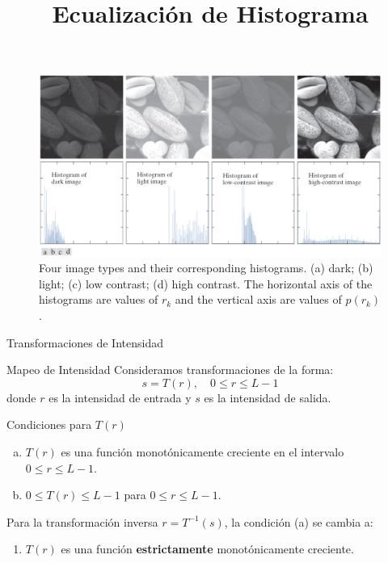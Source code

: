 \documentclass{beamer}
\begin{document}
\begin{frame}
    \begin{figure}
    \centering
      \includegraphics[width=0.8\linewidth]{figuras/Fig_3_16.png}
    \caption{Four image types and their corresponding histograms. (a) dark; (b) light; (c) low contrast; (d) high contrast. The horizontal axis of the histograms are values of $r_{k}$ and the vertical axis are values of $p(r_{k})$.}
    \end{figure}
\end{frame}

\title[Ecualización de Histograma]{Ecualización de Histograma}
\subtitle{}
\author[Tu Nombre/Institución]{}
\date{}
\institute{}
\begin{frame}
  \titlepage
\end{frame}


\begin{frame}{Transformaciones de Intensidad}
  \begin{block}{Mapeo de Intensidad}
    Consideramos transformaciones de la forma:
    \begin{equation}
      s = T(r), \quad 0 \le r \le L-1
    \end{equation}
    donde $r$ es la intensidad de entrada y $s$ es la intensidad de salida.
  \end{block}
  \pause
  \begin{alertblock}{Condiciones para $T(r)$}
    \begin{enumerate}[(a)]
      \item $T(r)$ es una función monotónicamente creciente en el intervalo $0 \le r \le L-1$.
      \item $0 \le T(r) \le L-1$ para $0 \le r \le L-1$.
    \end{enumerate}
    Para la transformación inversa $r = T^{-1}(s)$, la condición (a) se cambia a:
    \begin{enumerate}[(a')]
      \item $T(r)$ es una función \textbf{estrictamente} monotónicamente creciente.
    \end{enumerate}
  \end{alertblock}
\end{frame}
\end{document}
